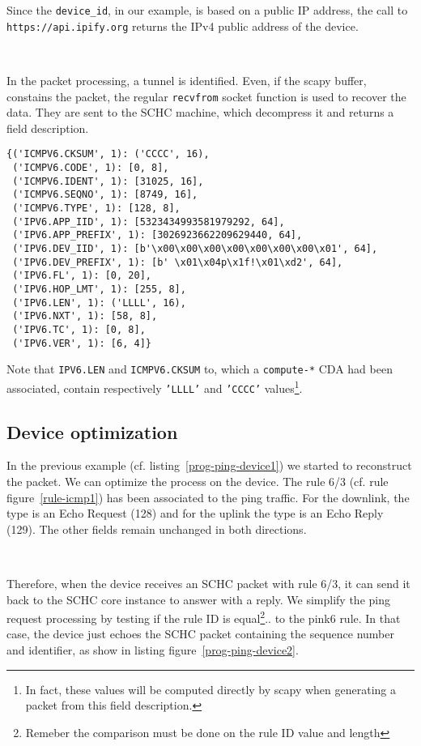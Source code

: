  Since the \texttt{device\_id}, in our example, is based on a public IP address, the call to \texttt{https://api.ipify.org} returns the IPv4 public address of the device. 
 
 ~~

In the packet processing, a tunnel is identified. Even, if the scapy buffer, constains the packet, the regular \texttt{recvfrom} socket function is used to recover the data. They are sent to the SCHC machine, which decompress it and returns a field description.

\begin{lstlisting}
{('ICMPV6.CKSUM', 1): ('CCCC', 16),
 ('ICMPV6.CODE', 1): [0, 8],
 ('ICMPV6.IDENT', 1): [31025, 16],
 ('ICMPV6.SEQNO', 1): [8749, 16],
 ('ICMPV6.TYPE', 1): [128, 8],
 ('IPV6.APP_IID', 1): [5323434993581979292, 64],
 ('IPV6.APP_PREFIX', 1): [3026923662209629440, 64],
 ('IPV6.DEV_IID', 1): [b'\x00\x00\x00\x00\x00\x00\x00\x01', 64],
 ('IPV6.DEV_PREFIX', 1): [b' \x01\x04p\x1f!\x01\xd2', 64],
 ('IPV6.FL', 1): [0, 20],
 ('IPV6.HOP_LMT', 1): [255, 8],
 ('IPV6.LEN', 1): ('LLLL', 16),
 ('IPV6.NXT', 1): [58, 8],
 ('IPV6.TC', 1): [0, 8],
 ('IPV6.VER', 1): [6, 4]}
\end{lstlisting}

Note that \texttt{IPV6.LEN} and \texttt{ICMPV6.CKSUM} to, which a \texttt{compute-*} CDA had been associated, contain respectively \texttt{'LLLL'} and \texttt{'CCCC'} values\footnote{In fact, these values will be computed directly by scapy when generating a packet from this field description.}.

\subsection{Device optimization}

In the previous example (cf. listing~\vref{prog-ping-device1}) we started to reconstruct the packet. We can optimize the process on the device. The rule 6/3 (cf. rule figure~\vref{rule-icmp1}) has been associated to the ping traffic. For the downlink, the type is an Echo Request (128) and for the uplink the type is an Echo Reply (129). The other fields remain unchanged in both directions.


~~

Therefore, when the device receives an SCHC packet with rule 6/3, it can send it back to the SCHC core instance to answer with a reply.
We simplify the ping request processing by testing if the rule ID is equal\footnote{Remeber the comparison must be done on the rule ID value and length}.. to the pink6 rule. In that case, the device just echoes the SCHC packet containing the sequence number and identifier, as show in listing figure~\vref{prog-ping-device2}.

